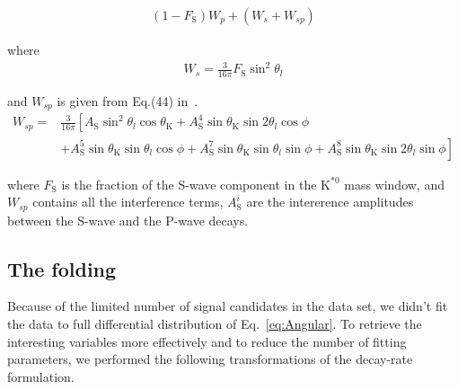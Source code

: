 \begin{equation} \label{eq:S-wave}
    \begin{split}
    (1-F_\mathrm{S})W_p + (W_s + W_{sp})
    \end{split}
\end{equation}

where 
\begin{equation} \label{eq:S-wave0}
    \begin{split}
      W_s = \frac{3}{16\pi} F_\mathrm{S}\sin^2\theta_l
    \end{split}
\end{equation}

and $W_{sp}$ is given from Eq.(44) in~\cite{Genon:Swave}. 
\begin{equation} \label{eq:S-wave1}
    \begin{split}
      W_{sp}= &\frac{3}{16 \pi}\left[ A_\mathrm{S}\sin^2\theta_l\cos\theta_\mathrm{K}+ A_\mathrm{S}^4\sin\theta_\mathrm{K}\sin2\theta_l\cos\phi\right.\\
            &+\left.A^5_\mathrm{S}\sin\theta_\mathrm{K}\sin\theta_l\cos\phi+A_\mathrm{S}^7\sin\theta_\mathrm{K}\sin\theta_l\sin\phi+A_\mathrm{S}^8\sin\theta_\mathrm{K}\sin2\theta_l\sin\phi\right]
    \end{split}
\end{equation}

where $F_\mathrm{S}$ is the fraction of the S-wave component in the
$\text{K}^{*0}$ mass window, and $W_{sp}$ contains all the
interference terms, $A_\mathrm{S}^i$ are the intererence amplitudes between the
S-wave and the P-wave decays\cite{Genon:Swave}.


\subsection{The \pdf folding}
\label{sec:folding}

Because of the
limited number of signal candidates in the data set, we didn't fit the
data to full differential distribution of Eq.~\ref{eq:Angular}. To
retrieve the interesting variables more effectively and to reduce the
number of fitting parameters, we performed the following transformations of the
decay-rate formulation.


